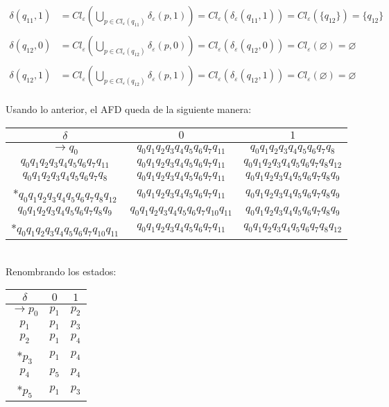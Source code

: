 \documentclass{article}
\begin{document}
\begin{enumerate}
\begin{align*}
        \delta(q_{11}, 1) &= Cl_{\varepsilon}(\bigcup_{p \in Cl_{\varepsilon}(q_{11})} \delta_{\varepsilon}(p,1)) = Cl_\varepsilon(\delta_\varepsilon(q_{11},1)) = Cl_\varepsilon(\{q_{12}\}) = \{q_{12}\}\\
      \end{align*}
      \begin{align*}
        \delta(q_{12}, 0) &= Cl_{\varepsilon}(\bigcup_{p \in Cl_{\varepsilon}(q_{12})} \delta_{\varepsilon}(p,0)) = Cl_\varepsilon(\delta_\varepsilon(q_{12},0)) = Cl_\varepsilon(\varnothing) = \varnothing\\
      \end{align*}
      \begin{align*}
        \delta(q_{12}, 1) &= Cl_{\varepsilon}(\bigcup_{p \in Cl_{\varepsilon}(q_{12})} \delta_{\varepsilon}(p,1)) = Cl_\varepsilon(\delta_\varepsilon(q_{12},1)) = Cl_\varepsilon(\varnothing) = \varnothing\\
      \end{align*}

      Usando lo anterior, el AFD queda de la siguiente manera:
    \begin{table}[!h]
      \centering
        \begin{tabular}{c|c|c}
            $\delta$ & $0$ & $1$ \\ \hline
            $\rightarrow q_0$ & $q_0q_1q_2q_3q_4q_5q_6q_7q_{11}$ & $q_0q_1q_2q_3q_4q_5q_6q_7q_8$ \\
            $q_0q_1q_2q_3q_4q_5q_6q_7q_{11}$ & $q_0q_1q_2q_3q_4q_5q_6q_7q_{11}$& $q_0q_1q_2q_3q_4q_5q_6q_7q_8q_{12}$\\
            $q_0q_1q_2q_3q_4q_5q_6q_7q_8$ & $q_0q_1q_2q_3q_4q_5q_6q_7q_{11}$& $q_0q_1q_2q_3q_4q_5q_6q_7q_8q_9$\\
            *$q_0q_1q_2q_3q_4q_5q_6q_7q_8q_{12}$ & $q_0q_1q_2q_3q_4q_5q_6q_7q_{11}$ & $q_0q_1q_2q_3q_4q_5q_6q_7q_8q_9$\\
            $q_0q_1q_2q_3q_4q_5q_6q_7q_8q_9$ & $q_0q_1q_2q_3q_4q_5q_6q_7q_{10}q_{11}$& $q_0q_1q_2q_3q_4q_5q_6q_7q_8q_9$ \\
            *$q_0q_1q_2q_3q_4q_5q_6q_7q_{10}q_{11}$ & $q_0q_1q_2q_3q_4q_5q_6q_7q_{11}$& $q_0q_1q_2q_3q_4q_5q_6q_7q_8q_{12}$
        \end{tabular}
    \end{table}\\

    Renombrando los estados:
    \begin{table}[!h]
      \centering
        \begin{tabular}{c|c|c}
            $\delta$ & $0$ & $1$ \\ \hline
            $\rightarrow p_0$ & $p_1$ & $p_2$ \\
            $p_1$ & $p_1$ & $p_3$\\
            $p_2$ & $p_1$ & $p_4$\\
            *$p_3$ & $p_1$ & $p_4$\\
            $p_4$ & $p_5$ & $p_4$ \\
            *$p_5$ & $p_1$ & $p_3$ 
        \end{tabular}


\end{table}
\end{enumerate}
\end{document}
